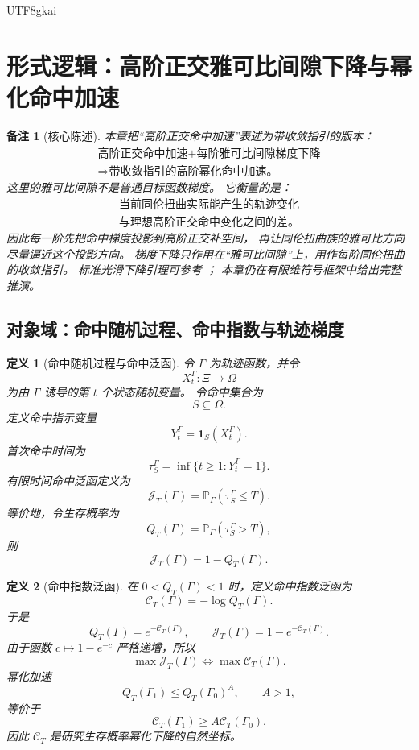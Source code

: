 \documentclass[12pt]{article}
\newtheorem{definition}{定义}[section]
\newtheorem{remark}{备注}[section]
\begin{document}
\begin{CJK*}{UTF8}{gkai}
\clearpage

\section{形式逻辑：高阶正交雅可比间隙下降与幂化命中加速}
\label{sec:tex55-jacobian-gap-power-hitting}

\begin{remark}[核心陈述]
本章把“高阶正交命中加速”表述为带收敛指引的版本：
\[
  \boxed{
  \begin{gathered}
  \text{高阶正交命中加速}
  +
  \text{每阶雅可比间隙梯度下降}\\
  \Longrightarrow
  \text{带收敛指引的高阶幂化命中加速。}
  \end{gathered}
  }
\]
这里的雅可比间隙不是普通目标函数梯度。
它衡量的是：
\[
  \boxed{
  \begin{gathered}
  \text{当前同伦扭曲实际能产生的轨迹变化}\\
  \text{与理想高阶正交命中变化之间的差。}
  \end{gathered}
  }
\]
因此每一阶先把命中梯度投影到高阶正交补空间，
再让同伦扭曲族的雅可比方向尽量逼近这个投影方向。
梯度下降只作用在“雅可比间隙”上，用作每阶同伦扭曲的收敛指引。
标准光滑下降引理可参考 \cite{NocedalWright2006NumericalOptimization}；
本章仍在有限维符号框架中给出完整推演。
\end{remark}

\subsection{对象域：命中随机过程、命中指数与轨迹梯度}
\label{subsec:tex55-jacgap-objects}

\begin{definition}[命中随机过程与命中泛函]
\label{def:tex55-jacgap-hit-process}
令 \(\Gamma\) 为轨迹函数，并令
\[
  X_t^\Gamma:\Xi\to\Omega
\]
为由 \(\Gamma\) 诱导的第 \(t\) 个状态随机变量。
令命中集合为
\[
  S\subseteq\Omega.
\]
定义命中指示变量
\[
  Y_t^\Gamma=\mathbf 1_S(X_t^\Gamma).
\]
首次命中时间为
\[
  \tau_S^\Gamma
  =
  \inf\{t\ge1:Y_t^\Gamma=1\}.
\]
有限时间命中泛函定义为
\[
  \mathcal J_T(\Gamma)
  =
  \mathbb P_\Gamma(\tau_S^\Gamma\le T).
\]
等价地，令生存概率为
\[
  Q_T(\Gamma)
  =
  \mathbb P_\Gamma(\tau_S^\Gamma>T),
\]
则
\[
  \mathcal J_T(\Gamma)=1-Q_T(\Gamma).
\]
\end{definition}

\begin{definition}[命中指数泛函]
\label{def:tex55-jacgap-hit-index}
在 \(0<Q_T(\Gamma)<1\) 时，定义命中指数泛函为
\[
  \mathcal C_T(\Gamma)
  =
  -\log Q_T(\Gamma).
\]
于是
\[
  Q_T(\Gamma)=e^{-\mathcal C_T(\Gamma)},
  \qquad
  \mathcal J_T(\Gamma)=1-e^{-\mathcal C_T(\Gamma)}.
\]
由于函数 \(c\mapsto 1-e^{-c}\) 严格递增，所以
\[
  \boxed{
  \max \mathcal J_T(\Gamma)
  \Longleftrightarrow
  \max \mathcal C_T(\Gamma).
  }
\]
幂化加速
\[
  Q_T(\Gamma_1)\le Q_T(\Gamma_0)^A,
  \qquad A>1,
\]
等价于
\[
  \mathcal C_T(\Gamma_1)\ge A\mathcal C_T(\Gamma_0).
\]
因此 \(\mathcal C_T\) 是研究生存概率幂化下降的自然坐标。
\end{definition}


\end{CJK*}
\end{document}
